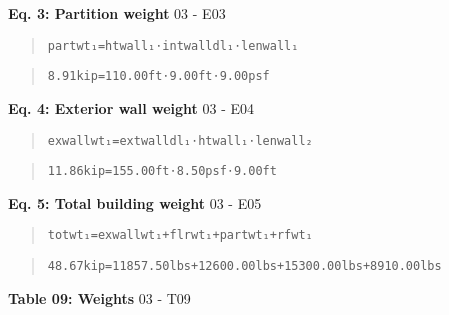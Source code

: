 \documentclass[12pt,notitle,letterpaper]{report}
\begin{document}
\textbf{Eq. 3: Partition weight}  \hfill 03 - E03

\begin{quote}
\begin{alltt}
partwt₁ = htwall₁⋅intwalldl₁⋅lenwall₁
\end{alltt}
\end{quote}

\begin{quote}
\begin{alltt}
8.91 kip = 110.00 ft⋅9.00 ft⋅9.00 psf
\end{alltt}
\end{quote}

\textbf{Eq. 4: Exterior wall weight}  \hfill 03 - E04

\begin{quote}
\begin{alltt}
exwallwt₁ = extwalldl₁⋅htwall₁⋅lenwall₂
\end{alltt}
\end{quote}

\begin{quote}
\begin{alltt}
11.86 kip = 155.00 ft⋅8.50 psf⋅9.00 ft
\end{alltt}
\end{quote}

\textbf{Eq. 5: Total building weight}  \hfill 03 - E05

\begin{quote}
\begin{alltt}
totwt₁ = exwallwt₁ + flrwt₁ + partwt₁ + rfwt₁
\end{alltt}
\end{quote}

\begin{quote}
\begin{alltt}
48.67 kip = 11857.50 lbs + 12600.00 lbs + 15300.00 lbs + 8910.00 lbs
\end{alltt}
\end{quote}

\vspace{.05in}

\textbf{Table 09: Weights}  \hfill 03 - T09

  \vspace{.05in}

\nopagebreak
\end{document}
